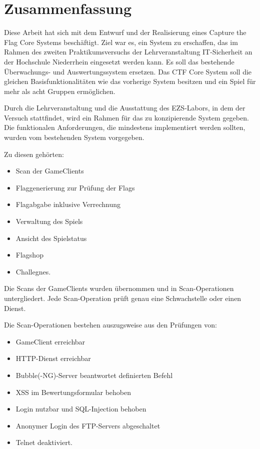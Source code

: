 \section{Zusammenfassung}
Diese Arbeit hat sich mit dem Entwurf und der Realisierung eines Capture the Flag Core Systems beschäftigt. Ziel war es, ein System zu erschaffen, das im Rahmen des zweiten Praktikumsversuchs der Lehrveranstaltung IT-Sicherheit an der Hochschule Niederrhein eingesetzt werden kann. Es soll das bestehende Überwachungs- und Auswertungssystem ersetzen. Das CTF Core System soll die gleichen Basisfunktionalitäten wie das vorherige System besitzen und ein Spiel für mehr als acht Gruppen ermöglichen.

Durch die Lehrveranstaltung und die Ausstattung des EZS-Labors, in dem der Versuch stattfindet, wird ein Rahmen für das zu konzipierende System gegeben.
Die funktionalen Anforderungen, die mindestens implementiert werden sollten, wurden vom bestehenden System vorgegeben.

Zu diesen gehörten:
\begin{itemize}
	\item Scan der GameClients
	\item Flaggenerierung zur Prüfung der Flags
	\item Flagabgabe inklusive Verrechnung
	\item Verwaltung des Spiels
	\item Ansicht des Spielstatus
	\item Flagshop
	\item Challegnes.
\end{itemize}

Die Scans der GameClients wurden übernommen und in Scan-Operationen untergliedert. Jede Scan-Operation prüft genau eine Schwachstelle oder einen Dienst.

Die Scan-Operationen bestehen auszugsweise aus den Prüfungen von:
\begin{itemize}
	\item GameClient erreichbar
	\item HTTP-Dienst erreichbar
	\item Bubble(-NG)-Server beantwortet definierten Befehl
	\item XSS im Bewertungsformular behoben
	\item Login nutzbar und SQL-Injection behoben
	\item Anonymer Login des FTP-Servers abgeschaltet
	\item Telnet deaktiviert.
\end{itemize}

